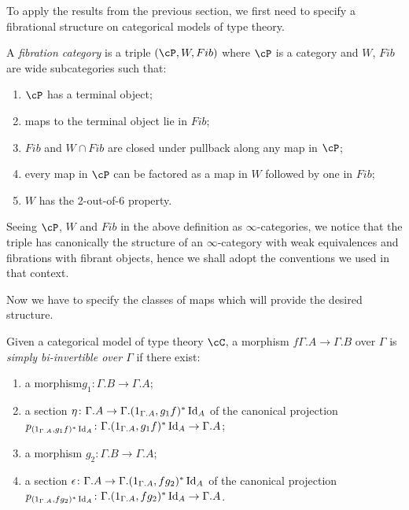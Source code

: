 \documentclass[a4paper,fontsize=12pt]{scrartcl}
\begin{document}
To apply the results from the previous section, we first need to specify a
fibrational structure on categorical models of type theory.

\begin{defn}
  A \emph{fibration category} is a triple $(\cP,W,Fib)$ where $\cP$ is a
  category and $W$, $Fib$ are wide subcategories such that:
  \begin{enumerate}
    \item $\cP$ has a terminal object;
    \item maps to the terminal object lie in $Fib$;
    \item $Fib$ and $W\cap Fib$ are closed under pullback along any map in $\cP$;
    \item every map in $\cP$ can be factored as a map in $W$ followed by one in
      $Fib$;
    \item $W$ has the 2-out-of-6 property.
  \end{enumerate}
\end{defn}

\begin{rmk}
  Seeing $\cP$, $W$ and $Fib$ in the above definition as $\infty$-categories, we
  notice that the triple has canonically the structure of an $\infty$-category
  with weak equivalences and fibrations with fibrant objects, hence we shall
  adopt the conventions we used in that context.
\end{rmk}

Now we have to specify the classes of maps which will provide the desired
structure.

\begin{defn}
  Given a categorical model of type theory $\cC$, a morphism
  $f\Gamma.A\rightarrow\Gamma.B$ over $\Gamma$ is \emph{simply bi-invertible
  over $\Gamma$} if there exist:
  \begin{enumerate}
    \item a morphism$g_1\colon\Gamma.B\rightarrow\Gamma.A$;
    \item a section $\eta\colon\Gamma.A\rightarrow\Gamma.(1_{\Gamma.A},g_1f)^*\operatorname{Id}_{A}$
      of the canonical projection
      $p_{(1_{\Gamma.A},g_1f)^*\operatorname{Id}_{A}}\colon
      \Gamma.(1_{\Gamma.A},g_1f)^*\operatorname{Id}_{A}\rightarrow\Gamma.A$;
    \item a morphism $g_2\colon\Gamma.B\rightarrow\Gamma.A$;
    \item a section
      $\epsilon\colon\Gamma.A\rightarrow\Gamma.(1_{\Gamma.A},fg_2)^*\operatorname{Id}_{A}$ of
      the canonical projection
      $p_{(1_{\Gamma.A},fg_2)^*\operatorname{Id}_{A}}\colon
      \Gamma.(1_{\Gamma.A},fg_2)^*\operatorname{Id}_{A}\rightarrow\Gamma.A$.
  \end{enumerate}
\end{defn}
\end{document}
